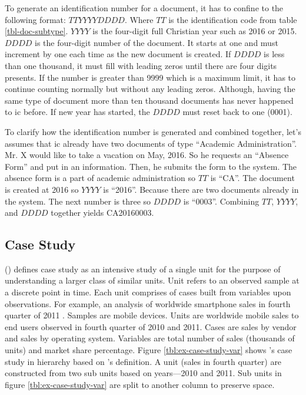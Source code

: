 To generate an identification number for a document, it has to confine to the following format: $TTYYYYDDDD$.
Where $TT$ is the identification code from table \ref{tbl-doc-subtype}.
$YYYY$ is the four-digit full Christian year such as 2016 or 2015.
$DDDD$ is the four-digit number of the document.
It starts at one and must increment by one each time as the new document is created.
If $DDDD$ is less than one thousand, it must fill with leading zeros until there are four digits presents.
If the number is greater than 9999 which is a maximum limit, it has to continue counting normally but without any leading zeros.
Although, having the same type of document more than ten thousand documents has never happened to \gls{ic} before.
If new year has started, the $DDDD$ must reset back to one (0001).

To clarify how the identification number is generated and combined together, let's assumes that \gls{ic} already have two documents of type \enquote{Academic Administration}.
Mr. X would like to take a vacation on May, 2016.
So he requests an \enquote{Absence Form} and put in an information.
Then, he submits the form to the system.
The absence form is a part of academic administration so $TT$ is \enquote{CA}.
The document is created at 2016 so $YYYY$ is \enquote{2016}.
Because there are two documents already in the system.
The next number is three so $DDDD$ is \enquote{0003}.
Combining $TT$, $YYYY$, and $DDDD$ together yields CA20160003.

\subsection{Case Study}
\citeauthor{merriam1988case} (\citeyear{merriam1988case}) defines case study as an intensive study of a single unit for the purpose of understanding a larger class of similar units.
Unit refers to an observed sample at a discrete point in time.
Each unit comprises of cases built from variables upon observations.
For example, an analysis of worldwide smartphone sales in fourth quarter of 2011 \cite{goasduff2012gartner}.
Samples are mobile devices.
Units are worldwide mobile sales to end users observed in fourth quarter of 2010 and 2011.
Cases are sales by vendor and sales by operating system.
Variables are total number of sales (thousands of units) and market share percentage.
Figure \ref{tbl:ex-case-study-var} shows \citeauthor{goasduff2012gartner}'s case study \cite{goasduff2012gartner} in hierarchy based on \citeauthor{merriam1988case}'s definition.
A unit (sales in fourth quarter) are constructed from two sub units based on years---2010 and 2011.
Sub units in figure \ref{tbl:ex-case-study-var} are split to another column to preserve space.

